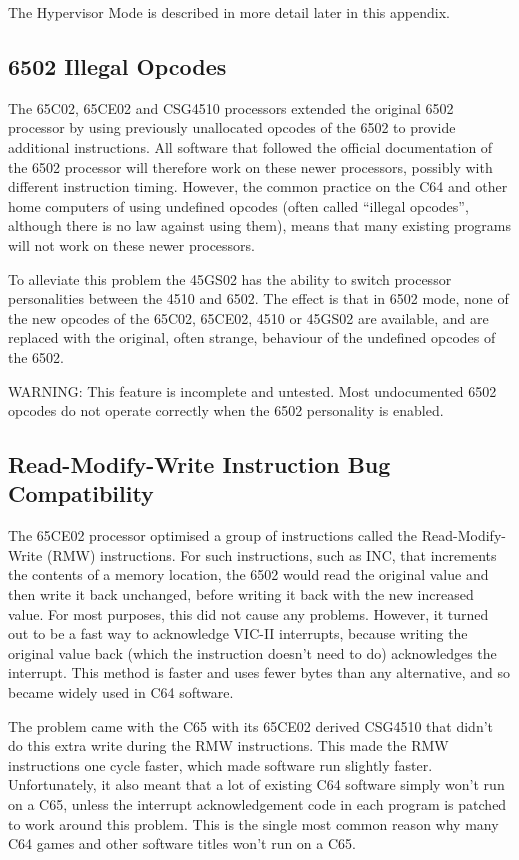The Hypervisor Mode is described in more detail later in this appendix.

\subsection{6502 Illegal Opcodes}

The 65C02, 65CE02 and CSG4510 processors extended the original 6502 processor
by using previously unallocated opcodes of the 6502 to provide additional
instructions.  All software that followed the official documentation of the 6502
processor will therefore work on these newer processors, possibly with different
instruction timing.  However, the common practice on the C64 and other home computers
of using undefined opcodes (often called ``illegal opcodes'', although there is no
law against using them), means that many existing programs will not work on these
newer processors.

To alleviate this problem the 45GS02 has the ability to switch processor personalities
between the 4510 and 6502.  The effect is that in 6502 mode, none of the new opcodes of
the 65C02, 65CE02, 4510 or 45GS02 are available, and are replaced with the original,
often strange, behaviour of the undefined opcodes of the 6502.

WARNING: This feature is incomplete and untested.  Most undocumented
6502 opcodes do not operate correctly when the 6502
personality is enabled.

\subsection{Read-Modify-Write Instruction Bug Compatibility}

The 65CE02 processor optimised a group of instructions called the
Read-Modify-Write (RMW) instructions.  For such instructions, such as
INC, that increments the contents of a memory location, the 6502 would
read the original value and then write it back unchanged, before
writing it back with the new increased value.  For most purposes, this
did not cause any problems. However, it turned out to be a fast way to
acknowledge VIC-II interrupts, because writing the original value back
(which the instruction doesn't need to do) acknowledges the interrupt.
This method is faster and uses fewer bytes than any alternative, and so
became widely used in C64 software.

The problem came with the C65 with its 65CE02 derived CSG4510 that
didn't do this extra write
during the RMW instructions.  This made the RMW instructions one cycle
faster, which made
software run slightly faster. Unfortunately, it also meant that a lot
of existing C64 software
simply won't run on a C65, unless the interrupt acknowledgement code in
each program is patched
to work around this problem. This is the single most common reason why
many C64 games and other
software titles won't run on a C65.

